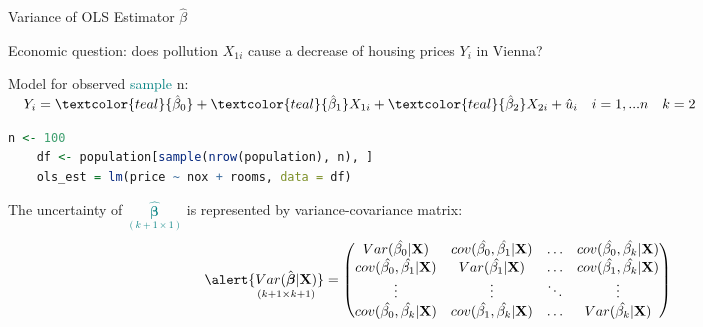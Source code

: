 \documentclass[11pt, aspectratio = 169]{beamer}
\begin{document}
\begin{frame}[fragile]{Variance of OLS Estimator $\hat{\beta}$}

\begin{center}
  Economic question: does pollution $X_{1i}$ \alert{cause} a decrease of housing prices $Y_i$ in Vienna?
\end{center}

Model for observed \textcolor{teal}{sample} n:
$\quad Y_i = \textcolor{teal}{\hat{\beta}_0} + \textcolor{teal}{\hat{\beta}_1} X_{1i} + \textcolor{teal}{\hat{\beta}_2} X_{2i} + \hat{u}_{i} \quad i = 1, ... n \quad k=2$
\begin{lstlisting}[language=R]
    n <- 100
    df <- population[sample(nrow(population), n), ]
    ols_est = lm(price ~ nox + rooms, data = df)
\end{lstlisting}
\pause
The uncertainty of \textcolor{teal}{$\underset{(k+1 \times 1)}{\hat{\boldsymbol{\beta}}}$} is represented by \alert{variance-covariance} matrix:
\begin{align*}
\alert{\underset{(k+1 \times k+1)}{Var(\hat{\boldsymbol{\beta}}|\mathbf{X})}} =  \begin{pmatrix}
                                            Var(\hat{\beta_0}|\mathbf{X}) & cov(\hat{\beta_0}, \hat{\beta_1}|\mathbf{X})  & \ldots & cov(\hat{\beta_0}, \hat{\beta_k}|\mathbf{X})   \\
                                            cov(\hat{\beta_0}, \hat{\beta_1}|\mathbf{X})  & Var(\hat{\beta_1}|\mathbf{X})  & \ldots & cov(\hat{\beta_1}, \hat{\beta_k}|\mathbf{X})      \\
                                            \vdots & \vdots   & \ddots & \vdots \\
                                            cov(\hat{\beta_0}, \hat{\beta_k}|\mathbf{X})  &  cov(\hat{\beta_1}, \hat{\beta_k}|\mathbf{X})  & \ldots & Var(\hat{\beta_k}|\mathbf{X}) \\
                                            \end{pmatrix}
\end{align*}
\end{frame}
\end{document}
